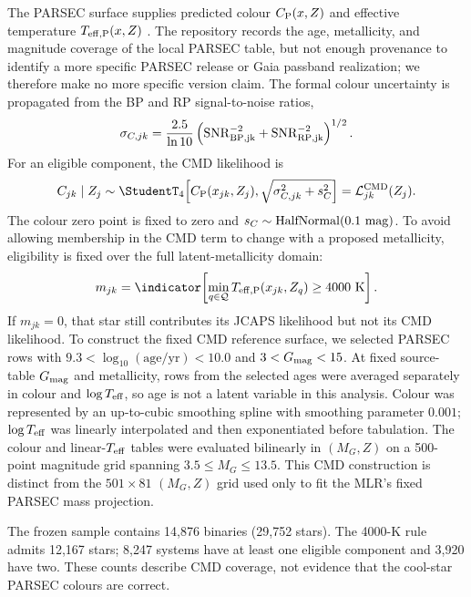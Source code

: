 The PARSEC surface supplies predicted colour $C_{\rm P}(x,Z)$ and effective
temperature $T_{\rm eff,P}(x,Z)$ \citep{Bressan2012PARSEC}.  The repository
records the age, metallicity, and magnitude coverage of the local PARSEC table,
but not enough provenance to identify a more specific PARSEC release or Gaia
passband realization; we therefore make no more specific version claim.  The
formal colour uncertainty is propagated
from the BP and RP signal-to-noise ratios,
\begin{equation}
 \sigma_{C,jk}=\frac{2.5}{\ln 10}
 \left(\mathrm{SNR}_{\rm BP,jk}^{-2}
 +\mathrm{SNR}_{\rm RP,jk}^{-2}\right)^{1/2}.
\end{equation}
For an eligible component, the CMD likelihood is
\begin{equation}
 C_{jk} \mid Z_j \sim \StudentT_{4}\!\left[
 C_{\rm P}(x_{jk},Z_j),
 \sqrt{\sigma_{C,jk}^2+s_C^2}\right] =  \mathcal{L}^{\rm CMD}_{jk}(Z_j).
 \label{eq:cmd}
\end{equation}
The colour zero point is fixed to zero and
$s_C\sim\operatorname{HalfNormal}(0.1\ {\rm mag})$.  To avoid allowing membership in the
CMD term to change with a proposed metallicity, eligibility is fixed over the
full latent-metallicity domain:
\begin{equation}
 m_{jk}=\indicator\!\left[
 \min_{q\in\mathcal Q}T_{\rm eff,P}(x_{jk},Z_q)\ge4000\ {\rm K}\right].
 \label{eq:warm-mask}
\end{equation}
If $m_{jk}=0$, that star still contributes its JCAPS likelihood but not its CMD
likelihood.  To construct the fixed CMD reference surface, we selected PARSEC
rows with $9.3<\log_{10}(\mathrm{age/yr})<10.0$ and
$3<G_{\rm mag}<15$.  At fixed source-table $G_{\rm mag}$ and metallicity, rows
from the selected ages were averaged separately in colour and
$\log T_{\rm eff}$, so age is not a latent variable in this analysis.  Colour
was represented by an up-to-cubic smoothing spline with smoothing parameter
$0.001$; $\log T_{\rm eff}$ was linearly interpolated and then exponentiated
before tabulation.  The colour and linear-$T_{\rm eff}$ tables were evaluated
bilinearly in $(M_G,Z)$ on a 500-point magnitude grid spanning
$3.5\le M_G\le13.5$.  This CMD construction is distinct from the
$501\times81$ $(M_G,Z)$ grid used only to fit the MLR's fixed PARSEC mass
projection.

The frozen sample contains 14,876 binaries (29,752 stars).  The 4000-K rule
admits 12,167 stars; 8,247 systems have at least one eligible component and
3,920 have two.  These counts describe CMD coverage, not evidence that the
cool-star PARSEC colours are correct.

